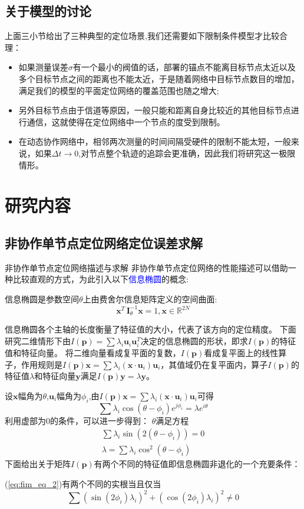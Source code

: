 \subsection{关于模型的讨论}
上面三小节给出了三种典型的定位场景,我们还需要如下限制条件模型才比较合理：
\begin{itemize}
  \item 如果测量误差$\sigma$有一个最小的阀值的话，部署的锚点不能离目标节点太近以及多个目标节点之间的距离也不能太近，于是随着网络中目标节点数目的增加，满足我们的模型的平面定位网络的覆盖范围也随之增大;
  \item 另外目标节点由于信道等原因，一般只能和距离自身比较近的其他目标节点进行通信，这就使得在定位网络中一个节点的度受到限制。
  \item 在动态协作网络中，相邻两次测量的时间间隔受硬件的限制不能太短，一般来说，如果$\Delta t \to 0$,对节点整个轨迹的追踪会更准确，因此我们将研究这一极限情形。
\end{itemize}
\section{研究内容}
\subsection{非协作单节点定位网络定位误差求解}
{非协作单节点定位网络描述与求解}
非协作单节点定位网络的性能描述可以借助一种比较直观的方式，为此引入以下\textcolor{blue}{信息椭圆}的概念:
\begin{definition}
信息椭圆是参数空间$\theta$上由费舍尔信息矩阵定义的空间曲面:
\begin{equation}\label{eq:ie}
\bm{x}^T\,\bm{I}_{\theta}^{-1}\bm{x}=1,\bm{x}\in \mathbb{R}^{2N}
\end{equation}
\end{definition}
信息椭圆各个主轴的长度衡量了特征值的大小，代表了该方向的定位精度。
下面研究二维情形下由$I(\bm{p})=\sum \lambda_i \bm{u}_i \bm{u}_i^T$决定的信息椭圆的形状，即求$I(\bm{p})$的特征值和特征向量。
将二维向量看成复平面的复数，$I(\bm{p})$看成复平面上的线性算子，作用规则是$I(\bm{p})\bm{x}=\sum \lambda_i (\bm{x}\cdot\bm{u}_i)\bm{u}_i$，其值域仍在复平面内，算子$I(\bm{p})$的特征值$\lambda$和特征向量$\bm{y}$满足$I(\bm{p})\bm{y}=\lambda \bm{y}$。


设$\bm{x}$幅角为$\theta$,$\bm{u}_i$幅角为$\phi_i$,由$I(\bm{p})\bm{x}=\sum \lambda_i (\bm{x}\cdot\bm{u}_i)\bm{u}_i$可得
\begin{equation}
\sum \lambda_i \cos(\theta-\phi_i)e^{j\phi_i}=\lambda e^{i\theta}
\end{equation}
利用虚部为0的条件，可以进一步得到：
$\theta$满足方程
\begin{eqnarray}\label{eq:fim_eq_1}
\sum \lambda_i \sin(2(\theta-\phi_i))=0\\
\lambda=\sum \lambda_i \cos^2(\theta-\phi_i)\label{eq:fim_eq_2}
\end{eqnarray}
下面给出关于矩阵$I(\bm{p})$有两个不同的特征值即信息椭圆非退化的一个充要条件：
\begin{theorem}
(\ref{eq:fim_eq_2})有两个不同的实根当且仅当\[
\sum (\sin(2\phi_i)\lambda_i)^2+(\cos(2\phi_i)\lambda_i)^2 \neq 0\]
\end{theorem}

